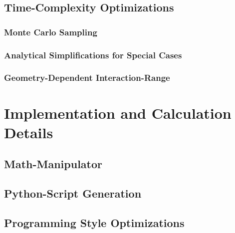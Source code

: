 \documentclass[
headings=optiontohead,              %
12pt,                               %
DIV=13,                             %
twoside=false,                      %
open=right,                         %
BCOR=00mm,                          %
toc=bibliographynumbered            %
]{scrreport}
\begin{document}
    \section{Time-Complexity Optimizations}
    \label{sec:theory-optimizations}
    
    \FloatBarrier

        \subsection{Monte Carlo Sampling}
        \label{sec:theory-optimizations-monte-carlo}
        
        \FloatBarrier

        \subsection{Analytical Simplifications for Special Cases}
        \label{sec:theory-optimizations-analytical}
        
        \FloatBarrier

        \subsection{Geometry-Dependent Interaction-Range}
        \label{sec:theory-optimizations-geometry}
        
        \FloatBarrier
        

\chapter{Implementation and Calculation Details}
\label{sec:implementation-details}

\FloatBarrier

    \section{Math-Manipulator}
    \label{sec:implementation-details-math-manipulator}
    
    \FloatBarrier

    \section{Python-Script Generation}
    \label{sec:implementation-details-script-generation}
    
    \FloatBarrier

    \section{Programming Style Optimizations}
    \label{sec:implementation-details-style-optimizations}
    
    \FloatBarrier
\end{document}

